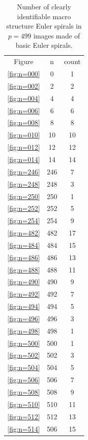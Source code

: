 \documentclass[pdftex,a4paper]{scrartcl}
\begin{document}
\begin{table}
    \caption{Number of clearly identifiable macro structure Euler spirals in $p = 499$ images made of basic Euler spirals.}
    \centering
    \begin{tabular}{c c c}
        Figure & n & count \\
        \ref{fig:n=000} &   0 & 1 \\
        \ref{fig:n=002} &   2 & 2 \\
        \ref{fig:n=004} &   4 & 4 \\
        \ref{fig:n=006} &   6 & 6 \\
        \ref{fig:n=008} &   8 & 8 \\
        \ref{fig:n=010} &  10 & 10 \\
        \ref{fig:n=012} &  12 & 12 \\
        \ref{fig:n=014} &  14 & 14 \\
        \ref{fig:n=246} & 246 & 7 \\
        \ref{fig:n=248} & 248 & 3 \\
        \ref{fig:n=250} & 250 & 1 \\
        \ref{fig:n=252} & 252 & 5 \\
        \ref{fig:n=254} & 254 & 9 \\
        \ref{fig:n=482} & 482 & 17 \\
        \ref{fig:n=484} & 484 & 15 \\
        \ref{fig:n=486} & 486 & 13 \\
        \ref{fig:n=488} & 488 & 11 \\
        \ref{fig:n=490} & 490 & 9 \\
        \ref{fig:n=492} & 492 & 7 \\
        \ref{fig:n=494} & 494 & 5 \\
        \ref{fig:n=496} & 496 & 3 \\
        \ref{fig:n=498} & 498 & 1 \\
        \ref{fig:n=500} & 500 & 1 \\
        \ref{fig:n=502} & 502 & 3 \\
        \ref{fig:n=504} & 504 & 5 \\
        \ref{fig:n=506} & 506 & 7 \\
        \ref{fig:n=508} & 508 & 9 \\
        \ref{fig:n=510} & 510 & 11 \\
        \ref{fig:n=512} & 512 & 13 \\
        \ref{fig:n=514} & 506 & 15 \\

\end{tabular}
\end{table}
\end{document}
